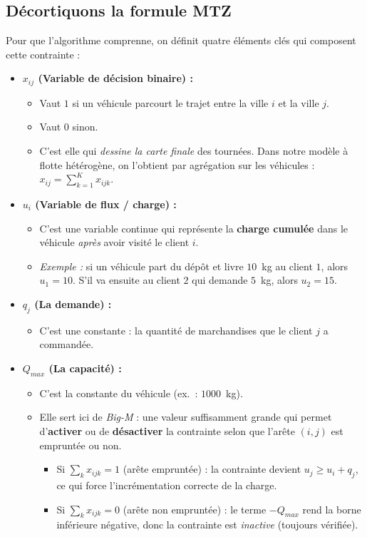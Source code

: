 \subsection{Décortiquons la formule MTZ}

Pour que l'algorithme comprenne, on définit quatre éléments clés qui composent cette contrainte :

\begin{itemize}
    \item \textbf{$x_{ij}$ (Variable de décision binaire) :}
    \begin{itemize}
        \item Vaut $1$ si un véhicule parcourt le trajet entre la ville $i$ et la ville $j$.
        \item Vaut $0$ sinon.
        \item C'est elle qui \textit{dessine la carte finale} des tournées. Dans notre modèle à flotte hétérogène, on l'obtient par agrégation sur les véhicules : $x_{ij} = \sum_{k=1}^{K} x_{ijk}$.
    \end{itemize}

    \item \textbf{$u_i$ (Variable de flux / charge) :}
    \begin{itemize}
        \item C'est une variable continue qui représente la \textbf{charge cumulée} dans le véhicule \textit{après} avoir visité le client $i$.
        \item \textit{Exemple :} si un véhicule part du dépôt et livre $10$~kg au client $1$, alors $u_1 = 10$. S'il va ensuite au client $2$ qui demande $5$~kg, alors $u_2 = 15$.
    \end{itemize}

    \item \textbf{$q_j$ (La demande) :}
    \begin{itemize}
        \item C'est une constante : la quantité de marchandises que le client $j$ a commandée.
    \end{itemize}

    \item \textbf{$Q_{max}$ (La capacité) :}
    \begin{itemize}
        \item C'est la constante du véhicule (ex.\ : $1000$~kg).
        \item Elle sert ici de \textit{Big-M} : une valeur suffisamment grande qui permet d'\textbf{activer} ou de \textbf{désactiver} la contrainte selon que l'arête $(i,j)$ est empruntée ou non.
        \begin{itemize}
            \item Si $\sum_k x_{ijk} = 1$ (arête empruntée) : la contrainte devient $u_j \geq u_i + q_j$, ce qui force l'incrémentation correcte de la charge.
            \item Si $\sum_k x_{ijk} = 0$ (arête non empruntée) : le terme $-Q_{max}$ rend la borne inférieure négative, donc la contrainte est \textit{inactive} (toujours vérifiée).
        \end{itemize}
    \end{itemize}
\end{itemize}

